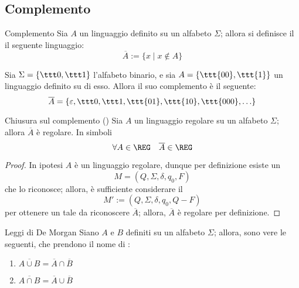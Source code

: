 \documentclass[a4paper, 12pt]{report}
\begin{document}
    \subsection{Complemento}

    \begin{frameddefn}{Complemento}
        Sia $A$ un linguaggio definito su un alfabeto $\Sigma$; allora si definisce il  il seguente linguaggio: $$\overline A := \{x \mid x \notin A\}$$
    \end{frameddefn}

    \begin{example}[Complemento]
        Sia $\Sigma = \{\ttt 0, \ttt 1\}$ l'alfabeto binario, e sia $A = \{ \ttt{00}, \ttt{1}\}$ un linguaggio definito su di esso. Allora il suo complemento è il seguente: $$\overline A = \{\varepsilon, \ttt 0, \ttt 1, \ttt{01}, \ttt{10}, \ttt{000}, \ldots\}$$
    \end{example}

    \begin{framedprop}[label={closure compl}]{Chiusura sul complemento (\REG)}
        Sia $A$ un linguaggio regolare su un alfabeto $\Sigma$; allora $\overline A$ è regolare. In simboli $$\forall A \in \REG \quad \overline A \in \REG$$
    \end{framedprop}

    \begin{proof}
        In ipotesi $A$ è un linguaggio regolare, dunque per definizione esiste un \DFA $$M = (Q, \Sigma, \delta, q_0, F)$$ che lo riconosce; allora, è sufficiente considerare il \DFA $$M' := (Q, \Sigma, \delta, q_0, Q-F)$$ per ottenere un \DFA tale da riconoscere $\overline A$; allora, $\overline A$ è regolare per definizione.
    \end{proof}

    \begin{framedprop}{Leggi di De Morgan}
        Siano $A$ e $B$ definiti su un alfabeto $\Sigma$; allora, sono vere le seguenti, che prendono il nome di :

        \begin{enumerate}[label=\roman*), font=\itshape]
            \item $\overline{A \cup B} = \overline A \cap \overline B$
            \item $\overline{A \cap B} = \overline A \cup \overline B$
        \end{enumerate}
    \end{framedprop}
\end{document}
